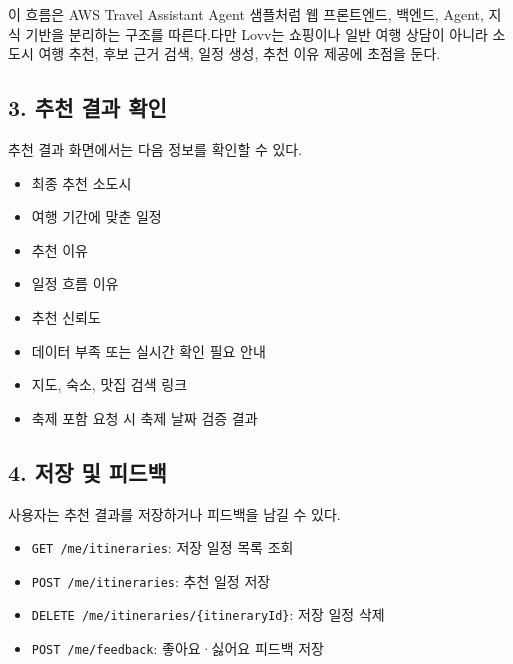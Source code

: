 \documentclass[12pt,a4paper]{article}
\newcommand{\DocNeedspace}[1]{\par\ifdim\dimexpr\pagegoal-\pagetotal\relax<#1\newpage\fi}
\begin{document}
\DocNeedspace{3\baselineskip}
이 흐름은 AWS Travel Assistant Agent 샘플처럼 웹 프론트엔드, 백엔드, Agent, 지식 기반을 분리하는 구조를 따른다.\newline 다만 Lovv는 쇼핑이나 일반 여행 상담이 아니라 소도시 여행 추천, 후보 근거 검색, 일정 생성, 추천 이유 제공에 초점을 둔다.


\DocNeedspace{24\baselineskip}
\subsection*{3. 추천 결과 확인}


\DocNeedspace{3\baselineskip}
추천 결과 화면에서는 다음 정보를 확인할 수 있다.


\begin{itemize}
\item 최종 추천 소도시
\item 여행 기간에 맞춘 일정
\item 추천 이유
\item 일정 흐름 이유
\item 추천 신뢰도
\item 데이터 부족 또는 실시간 확인 필요 안내
\item 지도, 숙소, 맛집 검색 링크
\item 축제 포함 요청 시 축제 날짜 검증 결과
\end{itemize}


\DocNeedspace{24\baselineskip}
\subsection*{4. 저장 및 피드백}


\DocNeedspace{3\baselineskip}
사용자는 추천 결과를 저장하거나 피드백을 남길 수 있다.


\begin{itemize}
\item \texttt{GET /\allowbreak{}me/\allowbreak{}itineraries}: 저장 일정 목록 조회
\item \texttt{POST /\allowbreak{}me/\allowbreak{}itineraries}: 추천 일정 저장
\item \texttt{DELETE /\allowbreak{}me/\allowbreak{}itineraries/\allowbreak{}\{\allowbreak{}itinerary\allowbreak{}Id\allowbreak{}\}}: 저장 일정 삭제
\item \texttt{POST /\allowbreak{}me/\allowbreak{}feedback}: 좋아요·싫어요 피드백 저장
\end{itemize}
\end{document}

